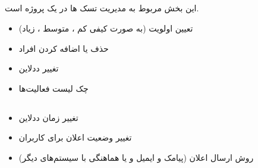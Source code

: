 \documentclass[10pt,a4paper]{article}
\begin{document}
\subsection{
}
این بخش مربوط به مدیریت تسک ها در یک پروژه است.
\begin{itemize}
	\item
تعیین اولویت (به صورت کیفی کم ، متوسط ، زیاد)
	\item 
	حذف یا اضافه کردن افراد
	\item
تغییر ددلاین 
	\item
	چک لیست فعالیت‌ها

\end{itemize}

\subsection{
}
\begin{itemize}
	\item 
تغییر زمان ددلاین
	\item
تغییر وضعیت اعلان برای کاربران
	\item
روش ارسال اعلان (پیامک و ایمیل و یا هماهنگی با سیستم‌های دیگر)
\end{itemize}
\end{document}

